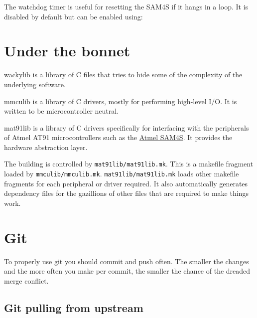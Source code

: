 The watchdog timer is useful for resetting the SAM4S if it hangs in a
loop.  It is disabled by default but can be enabled using:

\begin{Shaded}
\begin{Highlighting}[]

\NormalTok{)}
\NormalTok{\{}
   
    \NormalTok{ (}\NormalTok{)}
\NormalTok{    \{}

\NormalTok{    \}}
\NormalTok{\}}
\end{Highlighting}
\end{Shaded}

\section{Under the bonnet}
\label{under-the-bonnet}

wackylib is a library of C files that tries to hide some of the
complexity of the underlying software.

mmculib is a library of C drivers, mostly for performing high-level I/O.
It is written to be microcontroller neutral.

mat91lib is a library of C drivers specifically for interfacing with the
peripherals of Atmel AT91 microcontrollers such as the
\href{Atmel_SAM4S}{Atmel SAM4S}. It provides the hardware abstraction
layer.

The building is controlled by \texttt{mat91lib/mat91lib.mk}. This is a
makefile fragment loaded by \texttt{mmculib/mmculib.mk}.
\texttt{mat91lib/mat91lib.mk} loads other makefile fragments for each
peripheral or driver required. It also automatically generates
dependency files for the gazillions of other files that are required to
make things work.

\section{Git}
\label{git}

To properly use git you should commit and push often. The smaller the
changes and the more often you make per commit, the smaller the chance
of the dreaded merge conflict.

\subsection{Git pulling from upstream}
\label{git-pulling-from-upstream}

